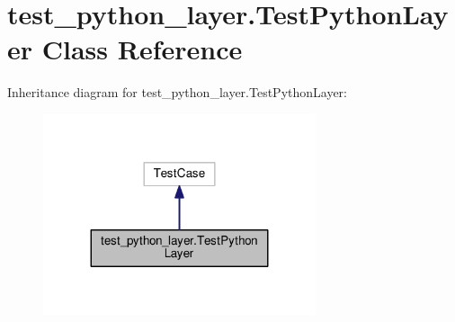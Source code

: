 \hypertarget{classtest__python__layer_1_1_test_python_layer}{}\section{test\+\_\+python\+\_\+layer.\+Test\+Python\+Layer Class Reference}
\label{classtest__python__layer_1_1_test_python_layer}


Inheritance diagram for test\+\_\+python\+\_\+layer.\+Test\+Python\+Layer\+:
\nopagebreak
\begin{figure}[H]
\begin{center}
\leavevmode
\includegraphics[width=227pt]{classtest__python__layer_1_1_test_python_layer__inherit__graph}
\end{center}
\end{figure}
